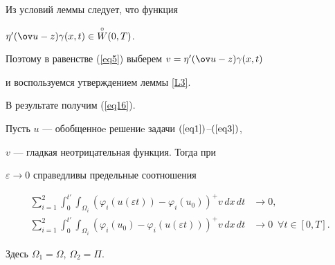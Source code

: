 \begin{pf}


Из условий леммы следует, что функция 


$\eta '(\ov u-z) \gamma (x,t) \in \overset{\circ}{W}(0,T)$.


Поэтому в равенстве (\ref{eq5}) выберем $v=\eta '(\ov u-z)\gamma (x,t)$


и воспользуемся утверждением леммы \ref{L3}.


В результате получим (\ref{eq16}).


\end{pf}


 


\begin{lem} \label{L5}


Пусть $u$ --- обобщенноe решениe задачи $(\ref{eq1})$--$(\ref{eq3})$,


$v$ --- гладкая неотрицательная функция. Тогда при


$\varepsilon \rightarrow 0$ справедливы предельные соотношения


\begin{align*} %


\sum_{i=1}^{2} \int_{0}^{{t}'} \int_{\Omega_{i}}


(\varphi_{i}(u(\varepsilon t))-


\varphi_{i} (u_{0}))^{+} v\, dx\, dt &\rightarrow 0, \\


%




\sum_{i=1}^{2} \int_{0}^{{t}'} \int_{\Omega_{i}} (\varphi_{i}(u_{0})-


\varphi_i(u(\varepsilon t)))^{+}v\,dx\, dt &\rightarrow 0


\ \; \forall t \in [0, T].


\end{align*}


Здесь $ \Omega_{1}=\Omega$, $\Omega_{2}=\Pi$. 


\end{lem}





